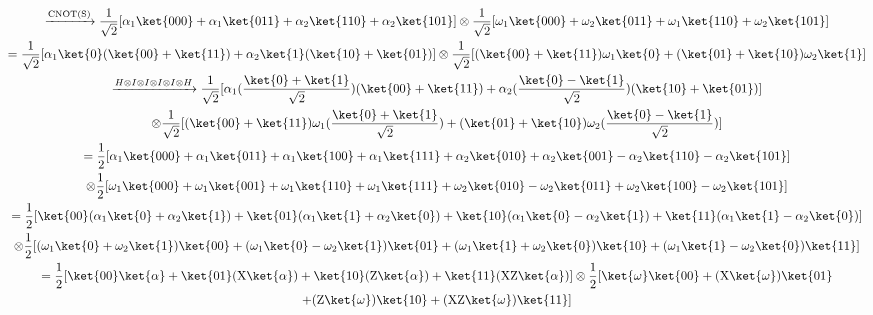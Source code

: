 \documentclass[]{article}
\begin{document}
\begin{enumerate}
        \begin{gather*}
          \xrightarrow{\text{CNOT(S)}}  \frac{1}{\sqrt{2}}[\alpha_1 \ket{000} + \alpha_1 \ket{011} + 
          \alpha_2 \ket{110} + \alpha_2 \ket{101}]
          \otimes \frac{1}{\sqrt{2}}[\omega_1 \ket{000} + \omega_2 \ket{011} + 
          \omega_1 \ket{110} + \omega_2 \ket{101}]\\
          = \frac{1}{\sqrt{2}}[\alpha_1 \ket{0}(\ket{00} + \ket{11}) + \alpha_2 \ket{1}(\ket{10} + \ket{01})]
          \otimes \frac{1}{\sqrt{2}}[(\ket{00} + \ket{11}) \omega_1 \ket{0} + (\ket{01} + \ket{10}) \omega_2 \ket{1}]\\
          \xrightarrow{H \otimes I \otimes I \otimes I \otimes I \otimes H}
          \frac{1}{\sqrt{2}}[\alpha_1 (\frac{\ket{0} + \ket{1}}{\sqrt{2}}) (\ket{00} + \ket{11}) 
          + \alpha_2 (\frac{\ket{0} - \ket{1}}{\sqrt{2}})(\ket{10} + \ket{01})] \\
          \otimes \frac{1}{\sqrt{2}}[(\ket{00} + \ket{11}) \omega_1 (\frac{\ket{0} + \ket{1}}{\sqrt{2}})
          + (\ket{01} + \ket{10}) \omega_2 (\frac{\ket{0} - \ket{1}}{\sqrt{2}})]\\
          = \frac{1}{2} [\alpha_1 \ket{000} + \alpha_1 \ket{011} + \alpha_1 \ket{100} + \alpha_1 \ket{111}
          + \alpha_2 \ket{010} + \alpha_2 \ket{001} - \alpha_2 \ket{110} - \alpha_2 \ket{101}]\\
          \otimes \frac{1}{2}[\omega_1 \ket{000} + \omega_1 \ket{001} + \omega_1 \ket{110} + \omega_1 \ket{111}
          + \omega_2 \ket{010} - \omega_2 \ket{011} + \omega_2 \ket{100} - \omega_2 \ket{101}]\\
          = \frac{1}{2}[\ket{00}(\alpha_1 \ket{0} + \alpha_2 \ket{1}) + \ket{01}(\alpha_1 \ket{1} + \alpha_2 \ket{0})
          + \ket{10}(\alpha_1 \ket{0} - \alpha_2 \ket{1}) + \ket{11}(\alpha_1 \ket{1} - \alpha_2 \ket{0})]\\
          \otimes \frac{1}{2}[(\omega_1 \ket{0} + \omega_2 \ket{1})\ket{00} 
          + (\omega_1 \ket{0} - \omega_2 \ket{1})\ket{01}
          + (\omega_1 \ket{1} + \omega_2 \ket{0})\ket{10} + (\omega_1 \ket{1} - \omega_2 \ket{0})\ket{11}]\\
          = \frac{1}{2}[\ket{00} \ket{\alpha} + \ket{01} (\text{X} \ket{\alpha}) + \ket{10} (\text{Z} \ket{\alpha})
          + \ket{11} (\text{XZ} \ket{\alpha})]
          \otimes \frac{1}{2}[\ket{\omega} \ket{00} + (\text{X} \ket{\omega}) \ket{01}\\
          + (\text{Z} \ket{\omega}) \ket{10} + (\text{XZ} \ket{\omega}) \ket{11}]\\

\end{gather*}
\end{enumerate}
\end{document}
